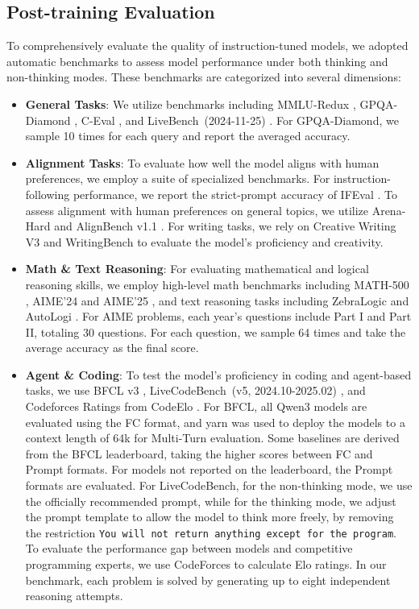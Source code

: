 \subsection{Post-training Evaluation}

To comprehensively evaluate the quality of instruction-tuned models, we adopted automatic benchmarks to assess model performance under both thinking and non-thinking modes. These benchmarks are categorized into several dimensions:

\begin{itemize}
    \item \textbf{General Tasks}: We utilize benchmarks including MMLU-Redux \citep{mmluredux}, GPQA-Diamond \citep{gpqa}, C-Eval \citep{ceval}, and LiveBench~(2024-11-25) \citep{livebench}. For GPQA-Diamond, we sample 10 times for each query and report the averaged accuracy. 

    \item \textbf{Alignment Tasks}: To evaluate how well the model aligns with human preferences, we employ a suite of specialized benchmarks. For instruction-following performance, we report the strict-prompt accuracy of IFEval \citep{ifeval}. To assess alignment with human preferences on general topics, we utilize Arena-Hard \citep{arena-hard} and AlignBench v1.1 \citep{alignbench}. For writing tasks, we rely on Creative Writing V3 \citep{creative_writing} and WritingBench \citep{writingbench} to evaluate the model's proficiency and creativity.
    
    \item \textbf{Math \& Text Reasoning}: For evaluating mathematical and logical reasoning skills, we employ high-level math benchmarks including MATH-500 \citep{lightman2023lets}, AIME'24 and AIME'25 \citep{aime}, and text reasoning tasks including ZebraLogic \citep{zebralogic} and AutoLogi \citep{autologi}. For AIME problems, each year's questions include Part I and Part II, totaling 30 questions. For each question, we sample 64 times and take the average accuracy as the final score.
    
    \item \textbf{Agent \& Coding}: To test the model's proficiency in coding and agent-based tasks, we use BFCL v3 \citep{bfcl}, LiveCodeBench~(v5, 2024.10-2025.02) \citep{livecodebench}, and Codeforces Ratings from CodeElo \citep{codelo}. For BFCL, all Qwen3 models are evaluated using the FC format, and yarn was used to deploy the models to a context length of 64k for Multi-Turn evaluation. Some baselines are derived from the BFCL leaderboard, taking the higher scores between FC and Prompt formats. For models not reported on the leaderboard, the Prompt formats are evaluated. For LiveCodeBench, for the non-thinking mode, we use the officially recommended prompt, while for the thinking mode, we adjust the prompt template to allow the model to think more freely, by removing the restriction \texttt{You will not return anything except for the program}. To evaluate the performance gap between models and competitive programming experts, we use CodeForces to calculate Elo ratings. In our benchmark, each problem is solved by generating up to eight independent reasoning attempts.
    

\end{itemize}
